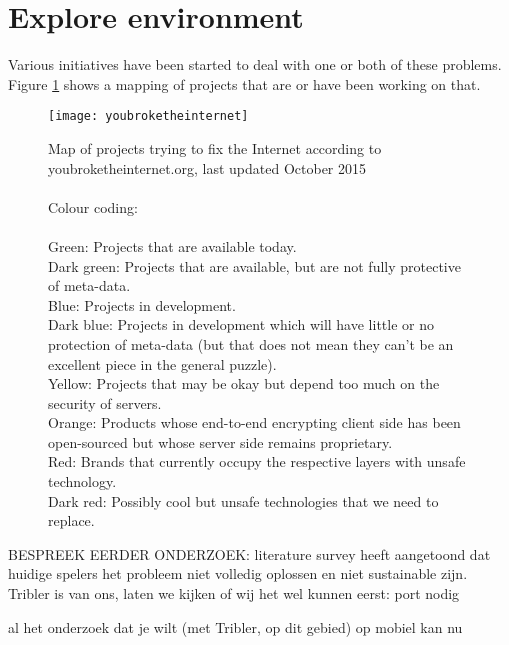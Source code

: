 \section{Explore environment}

Various initiatives have been started to deal with one or both of these problems.
Figure \ref{fig:youbroketheinternet} shows a mapping of projects that are or have been working on that.
\\
\begin{figure}[h]
	\centering
	\texttt{[image: youbroketheinternet]}
	\caption{Map of projects trying to fix the Internet according to youbroketheinternet.org, last updated October 2015\\
		\\
		Colour coding:\\
		\\
		\textcolor[RGB]{51,204,51}{Green:} Projects that are available today.\\
		\textcolor[RGB]{86,149,38}{Dark green:} Projects that are available, but are not fully protective of meta-data.\\
		\textcolor[RGB]{89,204,255}{Blue:} Projects in development.\\
		\textcolor[RGB]{17,153,211}{Dark blue:} Projects in development which will have little or no protection of meta-data (but that does not mean they can't be an excellent piece in the general puzzle).\\
		\textcolor[RGB]{226,228,27}{Yellow:} Projects that may be okay but depend too much on the security of servers.\\
		\textcolor[RGB]{255,153,51}{Orange:} Products whose end-to-end encrypting client side has been open-sourced but whose server side remains proprietary.\\
		\textcolor[RGB]{225,77,93}{Red:} Brands that currently occupy the respective layers with unsafe technology.\\
		\textcolor[RGB]{155,35,25}{Dark red:} Possibly cool but unsafe technologies that we need to replace.}
	\label{fig:youbroketheinternet}
\end{figure}



BESPREEK EERDER ONDERZOEK: literature survey heeft aangetoond dat huidige spelers het probleem niet volledig oplossen en niet sustainable zijn.
Tribler is van ons, laten we kijken of wij het wel kunnen
eerst: port nodig


al het onderzoek dat je wilt (met Tribler, op dit gebied) op mobiel kan nu

